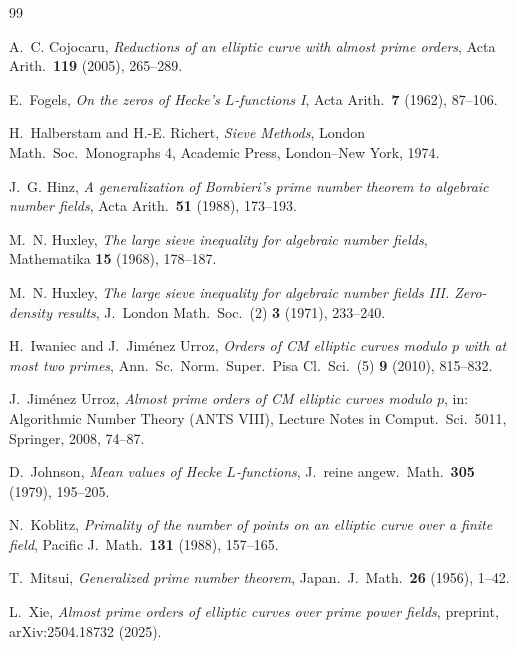 \documentclass[11pt]{amsart}
\theoremstyle{remark}
\begin{document}
\begin{thebibliography}{99}

 A.~C. Cojocaru, \emph{Reductions of an elliptic curve with almost prime orders}, Acta Arith.\ \textbf{119} (2005), 265--289.

 E.~Fogels, \emph{On the zeros of Hecke's $L$-functions I}, Acta Arith.\ \textbf{7} (1962), 87--106.

 H.~Halberstam and H.-E. Richert, \emph{Sieve Methods}, London Math.\ Soc.\ Monographs 4, Academic Press, London--New York, 1974.

 J.~G. Hinz, \emph{A generalization of Bombieri's prime number theorem to algebraic number fields}, Acta Arith.\ \textbf{51} (1988), 173--193.

 M.~N. Huxley, \emph{The large sieve inequality for algebraic number fields}, Mathematika \textbf{15} (1968), 178--187.

 M.~N. Huxley, \emph{The large sieve inequality for algebraic number fields III. Zero-density results}, J.\ London Math.\ Soc.\ (2) \textbf{3} (1971), 233--240.

 H.~Iwaniec and J.~Jim\'enez Urroz, \emph{Orders of CM elliptic curves modulo $p$ with at most two primes}, Ann.\ Sc.\ Norm.\ Super.\ Pisa Cl.\ Sci.\ (5) \textbf{9} (2010), 815--832.

 J.~Jim\'enez Urroz, \emph{Almost prime orders of CM elliptic curves modulo $p$}, in: Algorithmic Number Theory (ANTS VIII), Lecture Notes in Comput.\ Sci.\ 5011, Springer, 2008, 74--87.

 D.~Johnson, \emph{Mean values of Hecke $L$-functions}, J.\ reine angew.\ Math.\ \textbf{305} (1979), 195--205.

 N.~Koblitz, \emph{Primality of the number of points on an elliptic curve over a finite field}, Pacific J.\ Math.\ \textbf{131} (1988), 157--165.

 T.~Mitsui, \emph{Generalized prime number theorem}, Japan.\ J.\ Math.\ \textbf{26} (1956), 1--42.

 L.~Xie, \emph{Almost prime orders of elliptic curves over prime power fields}, preprint, arXiv:2504.18732 (2025).

\end{thebibliography}
\end{document}
